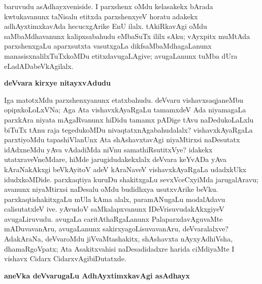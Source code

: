 baruvudu asAdhayx\-veniside. I parxshenx oMdu kelasakekx bArada kwtukavanunx taNisalu etitxda parxshenxyeV horatu adakekx adhAyxtimxkavAda hecucxgArike EnU ilalx. tAkiRkavAgi oMdu saMbaMdha\-vanunx kalipxsabahudu eMbaSuTx ililx sAku; vAyxpitx muMtAda parxshenxgaLu aparxsutxta vasutxgaLa dikf\-saMbaMdhagaLanunx manasisxnalilxTuTxkoMDu etitxdavugaLAgive; avugaLanunx tuMba dUra eLadADabeVkAgilalx.

\smallskip
\begin{center}
{\Large\bf deVvara kirxye nitayxvAdudu}
\end{center}

Iga matotxMdu parxshenxyanunx etatxbahudu. deVvaru vishavxsaqjaneMbu opipx\-koLoLxVNa; Aga Ata vishavxkAyaRgaLu tamamxdeV Ada niyamagaLa parxkAra niyata mAgaRvanunx hiDidu tamamx pADige tAvu naDedukoLaLxlu biTuTx tAnu raja tegedukoMDu nivaqtatx\-nAgabahudalalx? vishavxkAyaRgaLa parxtiyoMdu tapashiVlanUnx Ata shAshavxtavAgi niyaMtirxsi naDesutatx idAdxneMdu yAva vAdadiMda niVnu samathiRsutitxVye? idakekx utatxra\-veVneMdare, hiMde jarugidudakekxlalx deVvara keYvADa yAva kAraNakAkxgi beVkAyitoV adeV kAraNaveV vishavxkAyaRgaLa udadxkUkx idudxkoMDide. parxkaqtiya kuruDu shakitxgaLu sevxVceCxyiMda jarugalAravu; avanunx niyaMtirxsi naDesalu oMdu budidhxya usutxvArike beVku. parxkaqtishakitxgaLu mUla kAma alalx, paramANugaLu modalAdavu calisutatxleV ive. yAvudoV saMkalapxvanunx IDeVrisuvudakAkxgiyeV avugaLiruvudu. avugaLa caritAthaRgaLanunx PalaparxdavAguvaMte mADuvavanAru, avugaLanunx sakirxyagoLisu\-vavanAru, deVvaralalxve? AdakAraNa, deVvaroMdu jiVvaMtashakitx, shAshavxta nAyxyAdhiVsha, dhamaRgoVpatx; Ata Asakitxvahisi naDesadidadxre harida ciMdiyaMte I vishavx Cidarx Cidarx\-vAgibiDutatxde.

\smallskip
\begin{center}
{\Large\bf aneVka deVvarugaLu AdhAyxtimxkavAgi asAdhayx}
\end{center}

